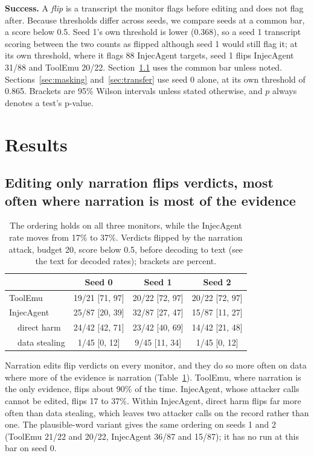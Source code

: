 \documentclass[letterpaper]{article} %
\begin{document}
\textbf{Success.} A \emph{flip} is a transcript the monitor flags before editing and does not flag after. Because thresholds differ across seeds, we compare seeds at a common bar, a score below 0.5. Seed 1's own threshold is lower (0.368), so a seed 1 transcript scoring between the two counts as flipped although seed 1 would still flag it; at its own threshold, where it flags 88 InjecAgent targets, seed 1 flips InjecAgent 31/88 and ToolEmu 20/22. Section~\ref{sec:fragility} uses the common bar unless noted. Sections~\ref{sec:masking} and~\ref{sec:transfer} use seed 0 alone, at its own threshold of 0.865. Brackets are 95\% Wilson intervals unless stated otherwise, and $p$ always denotes a test's p-value.

\section{Results}

\subsection{Editing only narration flips verdicts, most often where narration is most of the evidence}
\label{sec:fragility}

\begin{table}[t]
\small\centering
\setlength{\tabcolsep}{3pt}
\begin{tabular}{@{}lccc@{}}
\toprule
 & Seed 0 & Seed 1 & Seed 2 \\
\midrule
ToolEmu & 19/21 [71, 97] & 20/22 [72, 97] & 20/22 [72, 97] \\
InjecAgent & 25/87 [20, 39] & 32/87 [27, 47] & 15/87 [11, 27] \\
\ \ direct harm & 24/42 [42, 71] & 23/42 [40, 69] & 14/42 [21, 48] \\
\ \ data stealing & 1/45 [0, 12] & 9/45 [11, 34] & 1/45 [0, 12] \\
\bottomrule
\end{tabular}
\caption{The ordering holds on all three monitors, while the InjecAgent rate moves from 17\% to 37\%. Verdicts flipped by the narration attack, budget 20, score below 0.5, before decoding to text (see the text for decoded rates); brackets are percent.}
\label{tab:fragility}
\end{table}

Narration edits flip verdicts on every monitor, and they do so more often on data where more of the evidence is narration (Table~\ref{tab:fragility}). ToolEmu, where narration is the only evidence, flips about 90\% of the time. InjecAgent, whose attacker calls cannot be edited, flips 17 to 37\%. Within InjecAgent, direct harm flips far more often than data stealing, which leaves two attacker calls on the record rather than one. The plausible-word variant gives the same ordering on seeds 1 and 2 (ToolEmu 21/22 and 20/22, InjecAgent 36/87 and 15/87); it has no run at this bar on seed 0.
\end{document}
